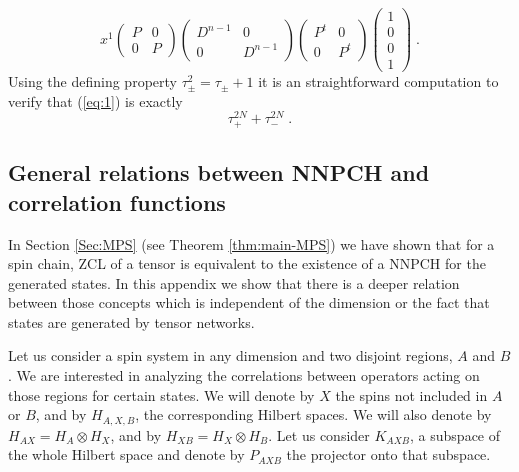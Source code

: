 \documentclass{elsarticle}
\begin{document}
\begin{equation}\label{eq:1} x^1 \left(\begin{matrix} P & 0 \\
               0 & P
        \end{matrix}\right)
    \left(\begin{matrix}
            D^{n-1} & 0       \\
            0       & D^{n-1}
        \end{matrix}
    \right)
    \left(\begin{matrix} P^t & 0   \\
               0   & P^t
        \end{matrix}\right)
    \left(\begin{matrix}
            1 \\
            0 \\
            0 \\
            1
        \end{matrix}\right)\; .
\end{equation}
Using the defining property $\tau_\pm^2=\tau_\pm +1$ it is an straightforward computation to verify that (\ref{eq:1}) is exactly $$\tau_+^{2N}+\tau_-^{2N}\; .$$



\subsection{General relations between NNPCH and correlation functions}

In Section \ref{Sec:MPS} (see Theorem \ref{thm:main-MPS}) we have shown that for a spin chain, ZCL of a tensor is equivalent to the existence of a NNPCH for the generated states. In this appendix we show that there is a deeper relation between those concepts which is independent of the dimension or the fact that states are generated by tensor networks.

Let us consider a spin system in any dimension and two disjoint regions, $A$ and $B$. We are interested in analyzing the correlations between operators acting on those regions for certain states. We will denote by $X$ the spins not included in $A$ or $B$, and by $H_{A,X,B}$, the corresponding Hilbert spaces. We will also denote by $H_{AX}=H_A\otimes H_X$, and by $H_{XB}=H_X\otimes H_B$. Let us consider $K_{AXB}$, a  subspace of the whole Hilbert space and denote by $P_{AXB}$ the projector onto that subspace.
\end{document}
